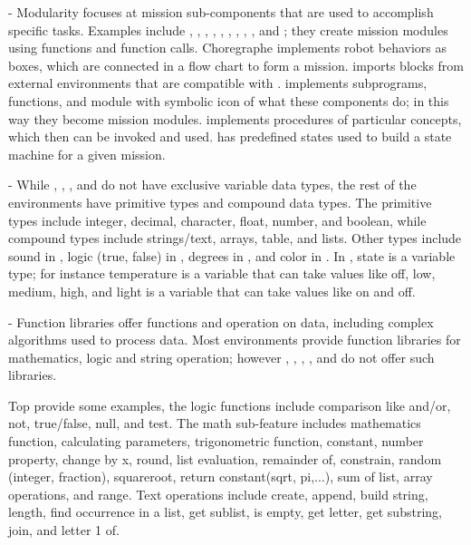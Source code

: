  - Modularity focuses at mission sub-components that are used to accomplish specific tasks.
Examples include \metabot, \ardublockly, \openroberta, \choregraphe, \sphero, \robotmesh, \metabot, \makeblock, \ozoblockly, and \turtlebot; they create mission modules using functions and function calls. Choregraphe implements robot behaviors as boxes, which are connected in a flow chart to form a mission. \lego imports blocks from external environments that are compatible with \lego. \trik implements subprograms, functions, and module with symbolic icon of what these components do; in this way they become mission modules. \picaxe implements procedures of particular concepts, which then can be invoked and used.  \missionlab has predefined states used to build a state machine for a given mission. 

 - While \flyaq, \missionlab, \tivipe, and \trik do not have exclusive variable data types, the rest of the environments have primitive types and compound data types. The primitive types include integer, decimal, character, float, number, and boolean, while compound types include strings/text, arrays, table, and lists. Other types include sound in \ozoblockly, logic (true, false) in \lego, degrees in \tello, and color in \sphero. In \aseba, state is a variable type;  for instance temperature is a variable that can take values like off, low, medium, high, and light is a variable that can take values like on and off. 

 - Function libraries offer functions and operation on data, including complex algorithms used to process data. Most environments provide function libraries for mathematics, logic and string operation; however \missionlab, \flyaq, \aseba, \codelab, and \tello do not offer such libraries. 

Top provide some examples, the logic functions include comparison like and/or, not, true/false, null, and test. The math sub-feature includes mathematics function, calculating parameters, trigonometric function, constant, number property, change by x, round, list evaluation, remainder of, constrain, random (integer, fraction), squareroot, return constant(sqrt, pi,...), sum of list, array operations, and range. Text operations include create, append, build string, length, find occurrence in a list, get sublist, is empty, get letter, get substring, join, and letter 1 of.  %

